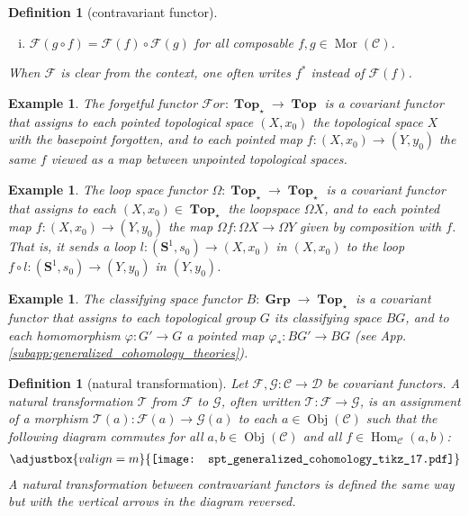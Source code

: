 \documentclass[sort&compress]{elsarticle}
\theoremstyle{theoremstyle}
\theoremstyle{framedtheoremstyle}
\theoremstyle{definitionstyle}
\newtheorem{dfn}[nul]{Definition}%
\theoremstyle{definitionstyle}
\theoremstyle{definitionstyle}
\theoremstyle{definitionstyle}
\newtheorem{exm}[nul]{Example}
\theoremstyle{nameddefinitionstyle}
\theoremstyle{framednameddefinitionstyle}
\theoremstyle{proofstyle}
\theoremstyle{definitionstyle}
\newcommand{\fromto}{\rightarrow}
\renewcommand{\SS}{\mathbf{S}}
\newcommand{\C}{\mathcal{C}}
\newcommand{\D}{\mathcal{D}}
\newcommand{\F}{\mathcal{F}}
\newcommand{\G}{\mathcal{G}}
\newcommand{\T}{\mathcal{T}}
\newcommand{\Top}{\operatorname{\mathbf{Top}}}
\newcommand{\Grp}{\operatorname{\mathbf{Grp}}}
\DeclareMathOperator{\Obj}{Obj}
\DeclareMathOperator{\Mor}{Mor}
\DeclareMathOperator{\Hom}{Hom}
\newcommand{\For}{\mathcal For}
\begin{document}
\begin{appendices}
\begin{dfn}[contravariant functor]
\begin{enumerate}[(i)]
\item $\F(g \circ f) = \F(f) \circ \F(g)$ for all composable $f,g\in \Mor(\C)$.
\end{enumerate}
When $\F$ is clear from the context, one often writes $f^\ast$ instead of $\F(f)$.
\end{dfn}

\begin{exm}
The forgetful functor $\For: \Top_\star \fromto \Top$ is a covariant functor that assigns to each pointed topological space $(X,x_0)$ the topological space $X$ with the basepoint forgotten, and to each pointed map $f: (X,x_0) \fromto (Y,y_0)$ the same $f$ viewed as a map between unpointed topological spaces.
\end{exm}

\begin{exm}
The loop space functor $\Omega: \Top_\star \fromto \Top_\star$ is a covariant functor that assigns to each $(X,x_0) \in \Top_\star$ the loopspace $\Omega X$, and to each pointed map $f: (X,x_0) \fromto (Y,y_0)$ the map $\Omega f: \Omega X \fromto \Omega Y$ given by composition with $f$. That is, it sends a loop $l: (\SS^1, s_0) \fromto (X,x_0)$ in $(X,x_0)$ to the loop $f \circ l: (\SS^1, s_0) \fromto (Y, y_0)$ in $(Y,y_0)$. 
\end{exm}

\begin{exm}
The classifying space functor $B: \Grp \fromto \Top_\star$ is a covariant functor that assigns to each topological group $G$ its classifying space $BG$, and to each homomorphism $\varphi: G' \fromto G$ a pointed map $\varphi_\ast: BG' \fromto BG$ (see App.\,\ref{subapp:generalized_cohomology_theories}).
\end{exm}

\begin{dfn}[natural transformation]
Let $\F, \G: \C \fromto \D$ be covariant functors. A natural transformation $\T$ from $\F$ to $\G$, often written $\T : \F \fromto \G$, is an assignment of a morphism $\T(a) : \F(a) \fromto \G(a)$ to each $a\in \Obj(\C)$ such that the following diagram commutes for all $a, b\in \Obj(\C)$ and all $f\in \Hom_{\C}(a,b)$:
\begin{eqnarray}
\adjustbox{valign=m}{\texttt{[image: spt\_generalized\_cohomology\_tikz\_17.pdf]}}
\end{eqnarray}
A natural transformation between contravariant functors is defined the same way but with the vertical arrows in the diagram reversed.
\end{dfn}


\end{appendices}
\end{document}
